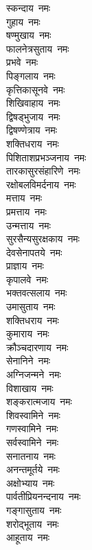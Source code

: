 
\begin{multicols}{2}
\begin{flushleft}
स्कन्दाय~नमः\\
गुहाय~नमः\\
षण्मुखाय~नमः\\
फालनेत्रसुताय~नमः\\
प्रभवे~नमः\\
पिङ्गलाय~नमः\\
कृत्तिकासूनवे~नमः\\
शिखिवाहाय~नमः\\
द्विषड्भुजाय~नमः\\
द्विषण्णेत्राय~नमः\hfill{}\\
शक्तिधराय~नमः\\
पिशिताशप्रभञ्जनाय~नमः\\
तारकासुरसंहारिणे~नमः\\
रक्षोबलविमर्दनाय~नमः\\
मत्ताय~नमः\\
प्रमत्ताय~नमः\\
उन्मत्ताय~नमः\\
सुरसैन्यसुरक्षकाय~नमः\\
देवसेनापतये~नमः\\
प्राज्ञाय~नमः\hfill{}\\
कृपालवे~नमः\\
भक्तवत्सलाय~नमः\\
उमासुताय~नमः\\
शक्तिधराय~नमः\\
कुमाराय~नमः\\
क्रौञ्चदारणाय~नमः\\
सेनानिने~नमः\\
अग्निजन्मने~नमः\\
विशाखाय~नमः\\
शङ्करात्मजाय~नमः\hfill{}\\
शिवस्वामिने~नमः\\
गणस्वामिने~नमः\\
सर्वस्वामिने~नमः\\
सनातनाय~नमः\\
अनन्तमूर्तये~नमः\\
अक्षोभ्याय~नमः\\
पार्वतीप्रियनन्दनाय~नमः\\
गङ्गासुताय~नमः\\
शरोद्भूताय~नमः\\
आहूताय~नमः\hfill{}\\

\end{flushleft}
\end{multicols}
